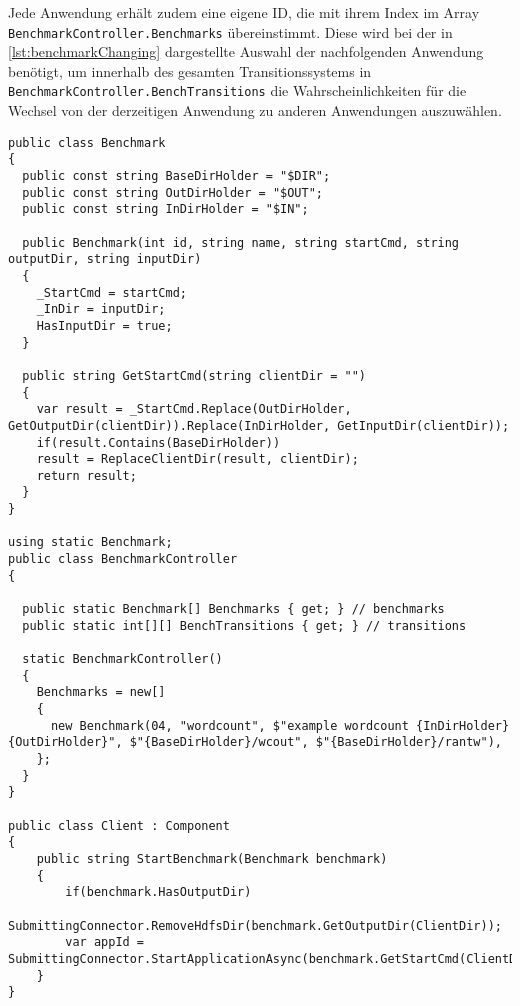 Jede Anwendung erhält zudem eine eigene ID, die mit ihrem Index im Array \texttt{BenchmarkController.Benchmarks} übereinstimmt.
Diese wird bei der in \cref{lst:benchmarkChanging} dargestellte Auswahl der nachfolgenden Anwendung benötigt, um innerhalb des gesamten Transitionssystems in \texttt{BenchmarkController.BenchTransitions} die Wahrscheinlichkeiten für die Wechsel von der derzeitigen Anwendung zu anderen Anwendungen auszuwählen.

\begin{lstlisting}[label=lst:benchmarkDefinition,style=cs,
caption={[Definition und Start einer Anwendung]
    Definition und Start einer Anwendung (gekürztes Beispiel).
    Die Generierung des komplettes Startbefehls mit Nutzung des Benchmark"=Scriptes führt der vom Client verwendete Connector durch, weshalb hier nur definiert werden muss, dass das Example"=Programm \acl{wc} gestartet wird.}]
public class Benchmark
{
  public const string BaseDirHolder = "$DIR";
  public const string OutDirHolder = "$OUT";
  public const string InDirHolder = "$IN";
  
  public Benchmark(int id, string name, string startCmd, string outputDir, string inputDir)
  {
    _StartCmd = startCmd;
    _InDir = inputDir;
    HasInputDir = true;
  }
  
  public string GetStartCmd(string clientDir = "")
  {
    var result = _StartCmd.Replace(OutDirHolder, GetOutputDir(clientDir)).Replace(InDirHolder, GetInputDir(clientDir));
    if(result.Contains(BaseDirHolder))
    result = ReplaceClientDir(result, clientDir);
    return result;
  }
}

using static Benchmark;
public class BenchmarkController
{
  
  public static Benchmark[] Benchmarks { get; } // benchmarks
  public static int[][] BenchTransitions { get; } // transitions
  
  static BenchmarkController()
  {
    Benchmarks = new[]
    {
      new Benchmark(04, "wordcount", $"example wordcount {InDirHolder} {OutDirHolder}", $"{BaseDirHolder}/wcout", $"{BaseDirHolder}/rantw"),
    };
  }
}

public class Client : Component
{
    public string StartBenchmark(Benchmark benchmark)
    {
        if(benchmark.HasOutputDir)
        SubmittingConnector.RemoveHdfsDir(benchmark.GetOutputDir(ClientDir));
        var appId = SubmittingConnector.StartApplicationAsync(benchmark.GetStartCmd(ClientDir));
    }
}
\end{lstlisting}

